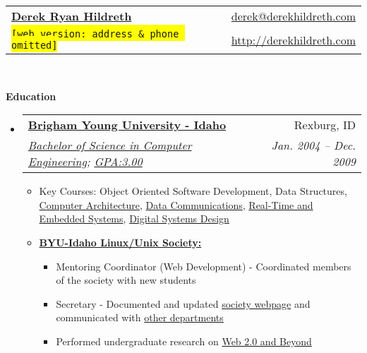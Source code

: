 \documentclass[letterpaper,11pt]{article}
\makeatletter
\newcommand{\resitem}[1]{\item #1 \vspace{-2pt}}
\newcommand{\resheading}[1]{{\large \colorbox{mygrey}{\begin{minipage}{\textwidth}{\textbf{#1 \vphantom{p\^{E}}}}\end{minipage}}}}
\newcommand{\ressubheading}[4]{
    \begin{tabular*}{6.5in}{l@{\extracolsep{\fill}}r}
      \textbf{#1} & #2 \\
      \textit{#3} & \textit{#4} \\
  \end{tabular*}\vspace{-6pt}}
\makeatother
\begin{document}
  \newcommand{\mywebheader}{
    \begin{tabular*}{7in}{l@{\extracolsep{\fill}}r}
      \textbf{\href{http://www.derekhildreth.com/}{\LARGE Derek Ryan Hildreth}} & \href{mailto:derek@derekhildreth.com}{derek@derekhildreth.com}\\
      {\footnotesize \texttt{\colorbox{yellow}{[web version:  address \& phone omitted]}}} & \href{http://www.derekhildreth.com}{http://derekhildreth.com} \\
    \end{tabular*}
    \\
  \vspace{0.1in}}

  \mywebheader

  \resheading{Education}
  \begin{itemize}
    \item
      \ressubheading{\href{http://www.byui.edu}{Brigham Young University - Idaho}}{Rexburg, ID}{\href{http://www.byui.edu/csee/compe/default.htm}{Bachelor of Science in Computer Engineering}; \href{http://www.derekhildreth.com/portfolio/unofficial_transcript.pdf}{GPA:3.00}}{Jan. 2004 -- Dec. 2009}
      { \footnotesize
	\begin{itemize}
	    \resitem{Key Courses: Object Oriented Software Development, Data Structures, \href{http://derekhildreth.com/portfolio/Resume/catalog/class.asp1045.htm}{Computer Architecture}, \href{http://derekhildreth.com/portfolio/Resume/catalog/class.asp1073.htm}{Data Communications}, \href{http://derekhildreth.com/portfolio/Resume/catalog/class.asp1072.htm}{Real-Time and Embedded Systems}, \href{http://derekhildreth.com/portfolio/Resume/catalog/class.asp1069.htm}{Digital Systems Design}}
	    \resitem{\textbf{\href{http://www.byui.edu/Societies/Linux/}{BYU-Idaho Linux/Unix Society:}}} 
	    \begin{itemize}
		\resitem{Mentoring Coordinator (Web Development) - Coordinated members of the society with new students}
		\resitem{Secretary - Documented and updated \href{http://www.byui.edu/Societies/Linux/default.htm}{society webpage} and communicated with \href{http://www.byui.edu/BusandComm/}{other departments}} 
		\resitem{Performed undergraduate research on \href{http://www.derekhildreth.com/portfolio/Research/Web_2.0_and_Beyond_Report_Column_Format.pdf}{Web 2.0 and Beyond}}
	    \end{itemize}

\end{itemize}}
\end{itemize}
\end{document}
